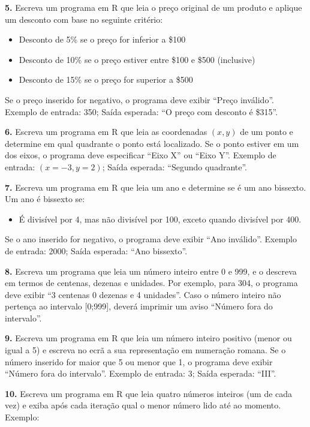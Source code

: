 \documentclass[
]{book}
\providecommand{\tightlist}{%
  \setlength{\itemsep}{0pt}\setlength{\parskip}{0pt}}
\begin{document}
\textbf{5.} Escreva um programa em R que leia o preço original de um produto
e aplique um desconto com base no seguinte critério:

\begin{itemize}
\item
  Desconto de 5\% se o preço for inferior a \$100
\item
  Desconto de 10\% se o preço estiver entre \$100 e \$500 (inclusive)
\item
  Desconto de 15\% se o preço for superior a \$500
\end{itemize}

Se o preço inserido for negativo, o programa deve exibir ``Preço
inválido''. Exemplo de entrada: 350; Saída esperada: ``O preço com
desconto é \$315''.

\textbf{6.} Escreva um programa em R que leia as coordenadas \((x, y)\) de um
ponto e determine em qual quadrante o ponto está localizado. Se o ponto
estiver em um dos eixos, o programa deve especificar ``Eixo X'' ou ``Eixo
Y''. Exemplo de entrada: \((x = -3, y = 2)\); Saída esperada: ``Segundo
quadrante''.

\textbf{7.} Escreva um programa em R que leia um ano e determine se é um ano
bissexto. Um ano é bissexto se:

\begin{itemize}
\tightlist
\item
  É divisível por 4, mas não divisível por 100, exceto quando
  divisível por 400.
\end{itemize}

Se o ano inserido for negativo, o programa deve exibir ``Ano inválido''.
Exemplo de entrada: 2000; Saída esperada: ``Ano bissexto''.

\textbf{8.} Escreva um programa que leia um número inteiro entre 0 e 999, e o
descreva em termos de centenas, dezenas e unidades. Por exemplo, para
304, o programa deve exibir ``3 centenas 0 dezenas e 4 unidades''. Caso o
número inteiro não pertença ao intervalo {[}0;999{]}, deverá imprimir um
aviso ``Número fora do intervalo''.

\textbf{9.} Escreva um programa em R que leia um número inteiro positivo
(menor ou igual a 5) e escreva no ecrã a sua representação em numeração
romana. Se o número inserido for maior que 5 ou menor que 1, o programa
deve exibir ``Número fora do intervalo''. Exemplo de entrada: 3; Saída
esperada: ``III''.

\textbf{10.} Escreva um programa em R que leia quatro números inteiros (um de
cada vez) e exiba após cada iteração qual o menor número lido até ao
momento. Exemplo:
\end{document}
